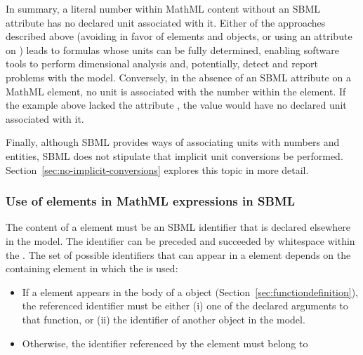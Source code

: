 In summary, a literal number within MathML content without an SBML
 attribute has no declared unit associated with it.
Either of the approaches described above (\ie avoiding 
in favor of  elements and \Parameter objects, or using
an  attribute on ) leads to formulas
whose units can be fully determined, enabling software tools to
perform dimensional analysis and, potentially, detect and report
problems with the model.  Conversely, in the absence of an SBML
 attribute on a MathML  element, no unit is
associated with the number within the  element.  If the
example above lacked the attribute , the value
 would have no declared unit associated with it.

Finally, although SBML provides ways of associating units with
numbers and entities, SBML does not stipulate that implicit unit
conversions be performed.
Section~\ref{sec:no-implicit-conversions} explores this topic in
more detail.


\subsubsection{Use of  elements in MathML expressions in SBML}
\label{sec:ci-token}

The content of a  element must be an SBML identifier
that is declared elsewhere in the model.  The identifier can be
preceded and succeeded by whitespace within the .  The
set of possible identifiers that can appear in a 
element depends on the containing element in which the 
is used:
\begin{itemize}
  
\item If a  element appears in the  body of
  a \FunctionDefinition object
  (Section~\ref{sec:functiondefinition}), the referenced
  identifier must be either (i) one of the declared arguments to
  that function, or (ii) the identifier of another
  \FunctionDefinition object in the model.
  
\item Otherwise, the identifier referenced by the 
  element must belong to 

\end{itemize}

